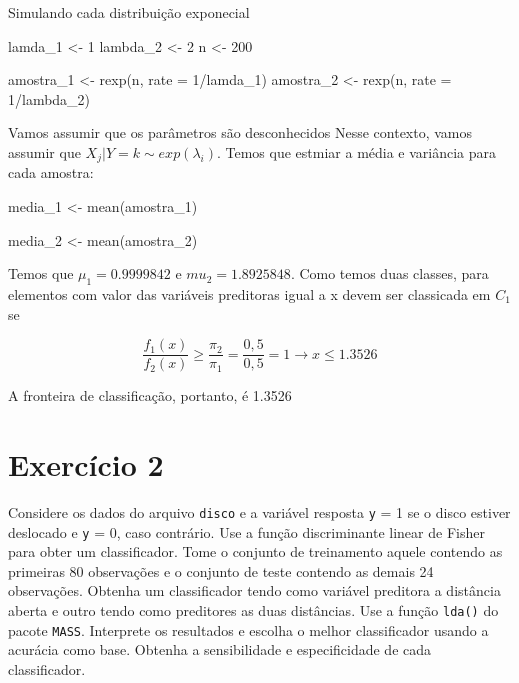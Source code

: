 \documentclass[
]{article}
\newenvironment{Shaded}{\begin{snugshade}}{\end{snugshade}}
\newcommand{\AttributeTok}[1]{\textcolor[rgb]{0.77,0.63,0.00}{#1}}
\newcommand{\DecValTok}[1]{\textcolor[rgb]{0.00,0.00,0.81}{#1}}
\newcommand{\FunctionTok}[1]{\textcolor[rgb]{0.00,0.00,0.00}{#1}}
\newcommand{\NormalTok}[1]{#1}
\newcommand{\OtherTok}[1]{\textcolor[rgb]{0.56,0.35,0.01}{#1}}
\newcommand{\SpecialCharTok}[1]{\textcolor[rgb]{0.00,0.00,0.00}{#1}}
\begin{document}
Simulando cada distribuição exponecial

\begin{Shaded}
\begin{Highlighting}[]
\NormalTok{lamda\_1 }\OtherTok{\textless{}{-}} \DecValTok{1}
\NormalTok{lambda\_2 }\OtherTok{\textless{}{-}} \DecValTok{2}
\NormalTok{n }\OtherTok{\textless{}{-}} \DecValTok{200}

\NormalTok{amostra\_1 }\OtherTok{\textless{}{-}} \FunctionTok{rexp}\NormalTok{(n, }\AttributeTok{rate =} \DecValTok{1}\SpecialCharTok{/}\NormalTok{lamda\_1)}
\NormalTok{amostra\_2 }\OtherTok{\textless{}{-}} \FunctionTok{rexp}\NormalTok{(n, }\AttributeTok{rate =} \DecValTok{1}\SpecialCharTok{/}\NormalTok{lambda\_2)}
\end{Highlighting}
\end{Shaded}

Vamos assumir que os parâmetros são desconhecidos Nesse contexto, vamos
assumir que \(X_j|Y = k \sim exp(\lambda_i)\). Temos que estmiar a média
e variância para cada amostra:

\begin{Shaded}
\begin{Highlighting}[]
\NormalTok{media\_1 }\OtherTok{\textless{}{-}}  \FunctionTok{mean}\NormalTok{(amostra\_1)}

\NormalTok{media\_2 }\OtherTok{\textless{}{-}}  \FunctionTok{mean}\NormalTok{(amostra\_2)}
\end{Highlighting}
\end{Shaded}

Temos que \(\mu_1 = 0.9999842\) e \(mu_2 = 1.8925848\). Como temos duas
classes, para elementos com valor das variáveis preditoras igual a x
devem ser classicada em \(C_1\) se

\begin{equation}
\frac{f_1(x)}{f_2(x)} \geq \frac{\pi_2}{\pi_1} = \frac{0,5}{0,5} = 1 \longrightarrow x \leq 1.3526

\end{equation}

A fronteira de classificação, portanto, é 1.3526

\hypertarget{exercuxedcio-2}{%
\section{Exercício 2}\label{exercuxedcio-2}}

Considere os dados do arquivo \texttt{disco} e a variável resposta
\texttt{y} = 1 se o disco estiver deslocado e \texttt{y} = 0, caso
contrário. Use a função discriminante linear de Fisher para obter um
classificador. Tome o conjunto de treinamento aquele contendo as
primeiras 80 observações e o conjunto de teste contendo as demais 24
observações. Obtenha um classificador tendo como variável preditora a
distância aberta e outro tendo como preditores as duas distâncias. Use a
função \texttt{lda()} do pacote \texttt{MASS}. Interprete os resultados
e escolha o melhor classificador usando a acurácia como base. Obtenha a
sensibilidade e especificidade de cada classificador.
\end{document}

